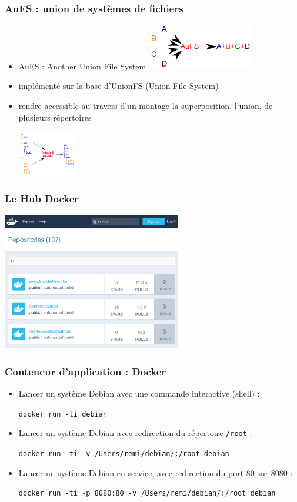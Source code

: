 \begin{frame}
\frametitle{AuFS : union de systèmes de fichiers\cite{AuFS}}
\begin{itemize}
\item AuFS : Another Union File System
\includegraphics[height=2cm]{../illustration/AuFS.png}
\item implémenté sur la base d’UnionFS (Union File System)
\item rendre accessible au travers d’un montage la superposition, l’union, de plusieurs répertoires

\includegraphics[height=2cm]{../illustration/AuFS-Exemples.png}
\end{itemize}

\end{frame}

\begin{frame}
\frametitle{Le Hub Docker}
\includegraphics[height=6cm]{../illustration/DockerHub.png}
\end{frame}

\begin{frame}
\frametitle{Conteneur d'application : Docker}
\begin{itemize}
\item Lancer un système Debian avec une commande interactive (shell) :

\texttt{docker run -ti debian}
\item Lancer un système Debian avec redirection du répertoire \texttt{/root} : 

\texttt{docker run -ti -v /Users/remi/debian/:/root debian}
\item Lancer un système Debian en service, avec redirection du port 80 sur 8080 :

\texttt{docker run -ti -p 8080:80 -v /Users/remi/debian/:/root debian}
\end{itemize}
\end{frame}

